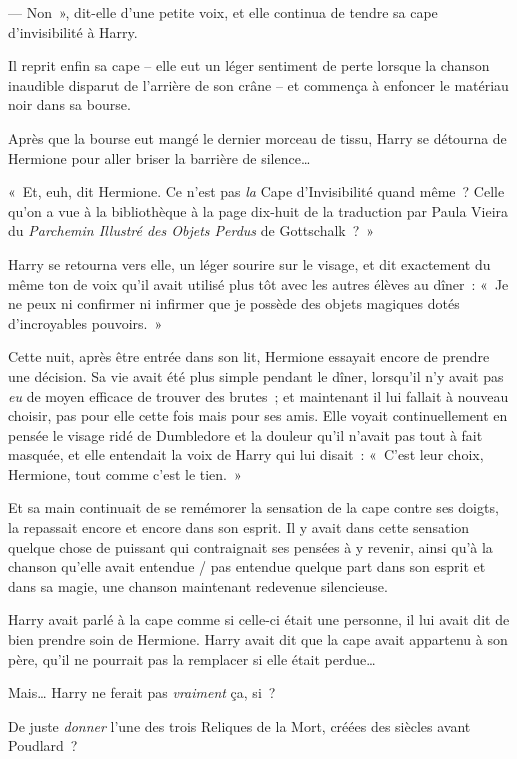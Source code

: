 --- Non~», dit-elle d'une petite voix, et elle continua de tendre sa cape d'invisibilité à Harry.

Il reprit enfin sa cape -- elle eut un léger sentiment de perte lorsque la chanson inaudible disparut de l'arrière de son crâne -- et commença à enfoncer le matériau noir dans sa bourse.

Après que la bourse eut mangé le dernier morceau de tissu, Harry se détourna de Hermione pour aller briser la barrière de silence…

«~Et, euh, dit Hermione. Ce n'est pas \emph{la} Cape d'Invisibilité quand même~? Celle qu'on a vue à la bibliothèque à la page dix-huit de la traduction par Paula Vieira du \emph{Parchemin Illustré des Objets Perdus} de Gottschalk~?~»

Harry se retourna vers elle, un léger sourire sur le visage, et dit exactement du même ton de voix qu'il avait utilisé plus tôt avec les autres élèves au dîner~: «~Je ne peux ni confirmer ni infirmer que je possède des objets magiques dotés d'incroyables pouvoirs.~»

\later

Cette nuit, après être entrée dans son lit, Hermione essayait encore de prendre une décision. Sa vie avait été plus simple pendant le dîner, lorsqu'il n'y avait pas \emph{eu} de moyen efficace de trouver des brutes~; et maintenant il lui fallait à nouveau choisir, pas pour elle cette fois mais pour ses amis. Elle voyait continuellement en pensée le visage ridé de Dumbledore et la douleur qu'il n'avait pas tout à fait masquée, et elle entendait la voix de Harry qui lui disait~: «~C'est leur choix, Hermione, tout comme c'est le tien.~»

Et sa main continuait de se remémorer la sensation de la cape contre ses doigts, la repassait encore et encore dans son esprit. Il y avait dans cette sensation quelque chose de puissant qui contraignait ses pensées à y revenir, ainsi qu'à la chanson qu'elle avait entendue / pas entendue quelque part dans son esprit et dans sa magie, une chanson maintenant redevenue silencieuse.

Harry avait parlé à la cape comme si celle-ci était une personne, il lui avait dit de bien prendre soin de Hermione. Harry avait dit que la cape avait appartenu à son père, qu'il ne pourrait pas la remplacer si elle était perdue…

Mais… Harry ne ferait pas \emph{vraiment} ça, si~?

De juste \emph{donner} l'une des trois Reliques de la Mort, créées des siècles avant Poudlard~?

